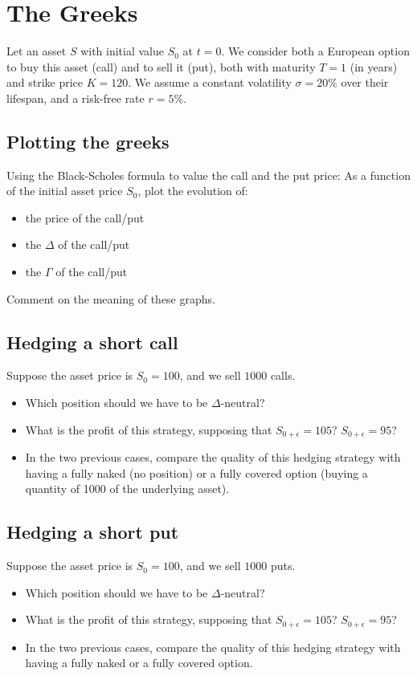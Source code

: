 \section*{The Greeks}
Let an asset $S$ with initial value $S_0$ at $t=0$. We consider both a European option to buy this asset (call) and to sell it (put), both with maturity $T = 1$ (in years) and strike price $K = 120$. We assume a constant volatility $\sigma=20\%$ over their lifespan, and a risk-free rate $r=5\%$. 

\subsection*{Plotting the greeks}
Using the Black-Scholes formula to value the call and the put price:
As a function of the initial asset price $S_0$, plot the evolution of:
\begin{itemize}
    \item the price of the call/put
    \item the $\Delta$ of the call/put
    \item the $\Gamma$ of the call/put
\end{itemize}

\noindent Comment on the meaning of these graphs.

\subsection*{Hedging a short call}
Suppose the asset price is $S_0 = 100$, and we sell $1000$ calls. 
\begin{itemize}
    \item Which position should we have to be $\Delta$-neutral?
    \item What is the profit of this strategy, supposing that $S_{0+\epsilon} = 105$? $S_{0+\epsilon} = 95$? 
    \item In the two previous cases, compare the quality of this hedging strategy with having a fully naked (no position) or a fully covered option (buying a quantity of 1000 of the underlying asset).
\end{itemize}

\subsection*{Hedging a short put}
Suppose the asset price is $S_0 = 100$, and we sell $1000$ puts. 
\begin{itemize}
    \item Which position should we have to be $\Delta$-neutral?
    \item What is the profit of this strategy, supposing that $S_{0+\epsilon} = 105$? $S_{0+\epsilon} = 95$? 
    \item In the two previous cases, compare the quality of this hedging strategy with having a fully naked or a fully covered option.
\end{itemize}

